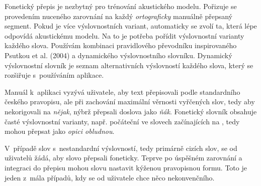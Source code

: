 Fonetický přepis je nezbytný pro trénování akustického modelu. Pořizuje se
provedením nuceného zarovnání na každý {\em ortograficky} manuálně přepsaný segment. Pokud je více
výslovnostních variant, automaticky se zvolí ta, která lépe odpovídá akustickému
modelu. Na to je potřeba pořídit výslovnostní varianty každého slova. Používám
kombinaci pravidlového převodníku inspirovaného Psutkou et
al. (2004)\cite{psutka2004development} a dynamického výslovnostního slovníku. Dynamický
výslovnostní slovník je seznam alternativních výslovností každého slova, který
se rozšiřuje s~používáním aplikace.

Manuál k~aplikaci vyzývá uživatele, aby text přepisovali podle standardního
českého pravopisu, ale při zachování maximální věrnosti vyřčených slov, tedy aby
nekorigovali
na {\em nějak}, nýbrž
přepsali doslova jako {\em ňák}. Fonetický slovník obsahuje časté výslovnostní
varianty, např. počáteční
{}
ve slovech
začínajících na
,
tedy
{}
mohou přepsat jako {\em opici obludnou}.

V~případě slov s~nestandardní výslovností, tedy primárně cizích slov, se od
uživatelů žádá, aby slovo přepsali foneticky. Teprve po úspěšném zarovnání a
integraci do přepisu mohou slovu nastavit kýženou pravopisnou formu. Toto je
jeden z~mála případů, kdy se od uživatele chce něco nekonvenčního.

